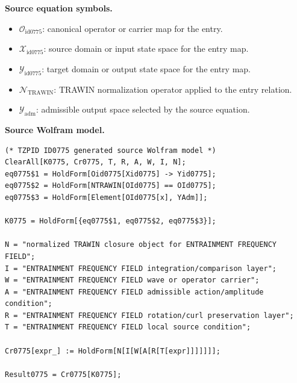\begin{minipage}[t]{0.49\linewidth}
\begingroup
\small
\raggedright
\textbf{Source equation symbols.}\par
\begin{itemize}[leftmargin=1.35em,itemsep=1pt,topsep=1pt,parsep=0pt]
    \item $\mathcal{O}_{\mathrm{id0775}}$: canonical operator or carrier map for the entry.
    \item $\mathcal{X}_{\mathrm{id0775}}$: source domain or input state space for the entry map.
    \item $\mathcal{Y}_{\mathrm{id0775}}$: target domain or output state space for the entry map.
    \item $\mathcal{N}_{\mathrm{TRAWIN}}$: TRAWIN normalization operator applied to the entry relation.
    \item $\mathcal{Y}_{\mathrm{adm}}$: admissible output space selected by the source equation.
\end{itemize}
\endgroup
\end{minipage}\hfill
\begin{minipage}[t]{0.47\linewidth}
\begingroup
\scriptsize
\raggedright
\textbf{Source Wolfram model.}\par
\begin{Verbatim}[fontsize=\tiny,breaklines=true,breakanywhere=true]
(* TZPID ID0775 generated source Wolfram model *)
ClearAll[K0775, Cr0775, T, R, A, W, I, N];
eq0775$1 = HoldForm[Oid0775[Xid0775] -> Yid0775];
eq0775$2 = HoldForm[NTRAWIN[OId0775] == OId0775];
eq0775$3 = HoldForm[Element[OId0775[x], YAdm]];

K0775 = HoldForm[{eq0775$1, eq0775$2, eq0775$3}];

N = "normalized TRAWIN closure object for ENTRAINMENT FREQUENCY FIELD";
I = "ENTRAINMENT FREQUENCY FIELD integration/comparison layer";
W = "ENTRAINMENT FREQUENCY FIELD wave or operator carrier";
A = "ENTRAINMENT FREQUENCY FIELD admissible action/amplitude condition";
R = "ENTRAINMENT FREQUENCY FIELD rotation/curl preservation layer";
T = "ENTRAINMENT FREQUENCY FIELD local source condition";

Cr0775[expr_] := HoldForm[N[I[W[A[R[T[expr]]]]]]];

Result0775 = Cr0775[K0775];
\end{Verbatim}
\endgroup
\end{minipage}

